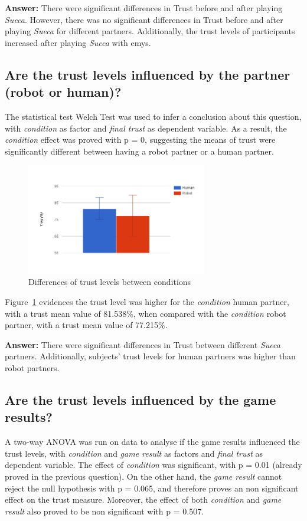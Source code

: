 \textbf{Answer:} There were significant differences in Trust before and after playing \emph{Sueca}.
However, there was no significant differences in Trust before and after playing \emph{Sueca} for different partners.
Additionally, the trust levels of participants increased after playing \emph{Sueca} with \ac{emys}.



\subsection*{Are the trust levels influenced by the partner (robot or human)?}
The statistical test Welch Test was used to infer a conclusion about this question, with \emph{condition} as factor and \emph{final trust} as dependent variable.
As a result, the \emph{condition} effect was proved with p = 0, suggesting the means of trust were significantly different between having a robot partner or a human partner.

\begin{figure}[h!]
  \centering
    \includegraphics[width=0.7\textwidth]{./img/7/trustCondition}
  \caption{Differences of trust levels between conditions}
\label{fig:trustCondition}
\end{figure}

Figure~\ref{fig:trustCondition} evidences the trust level was higher for the \emph{condition} human partner, with a trust mean value of 81.538\%, when compared with the \emph{condition} robot partner, with a trust mean value of 77.215\%.

\textbf{Answer:} There were significant differences in Trust between different \emph{Sueca} partners.
Additionally, subjects' trust levels for human partners was higher than robot partners.


\subsection*{Are the trust levels influenced by the game results?}
A two-way ANOVA was run on data to analyse if the game results influenced the trust levels, with \emph{condition} and \emph{game result} as factors and \emph{final trust} as dependent variable.
The effect of \emph{condition} was significant, with p = 0.01 (already proved in the previous question).
On the other hand, the \emph{game result} cannot reject the null hypothesis with p = 0.065, and therefore proves an non significant effect on the trust measure.
Moreover, the effect of both \emph{condition} and \emph{game result} also proved to be non significant with p = 0.507.


